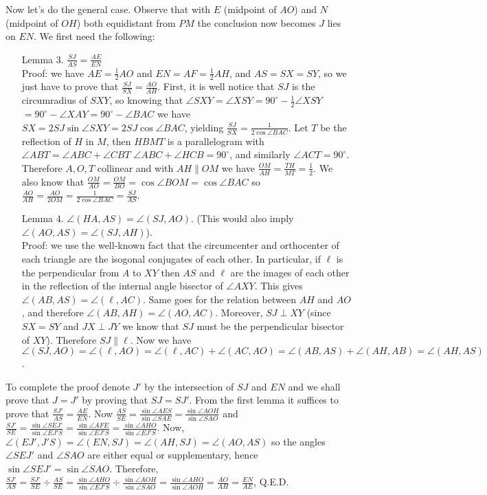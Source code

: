 \documentclass[11pt,a4paper]{article}
\begin{document}
\begin{itemize}
Now let's do the general case. Observe that with $E$ (midpoint of $AO$) and $N$ (midpoint of $OH$) both equidistant from $PM$ the conclusion now becomes $J$ lies on $EN$. We first need the following: 
\begin{itemize}
\item [Lemma 3.] $\frac {SJ}{AS}=\frac {AE}{EN}$\\
Proof: we have $AE=\frac 12 AO$ and $EN=AF=\frac 12 AH$, and $AS=SX=SY$, 
so we just have to prove that 
$\frac {SJ}{SX}=\frac {AO}{AH}$.
First, it is well notice that $SJ$ is the circumradius of $SXY$, so knowing that $\angle SXY=\angle XSY=90^{\circ}-\frac 12\angle XSY$
$= 90^{\circ}-\angle XAY=90^{\circ}-\angle BAC$ we have 
$SX=2SJ\sin\angle SXY=2SJ\cos\angle BAC$, yielding $\frac {SJ}{SX}=\frac {1}{2\cos\angle BAC}$.
Let $T$ be the reflection of $H$ in $M$, then $HBMT$ is a parallelogram with $\angle ABT=\angle ABC+\angle CBT$
$\angle ABC+\angle HCB=90^{\circ}$, and similarly $\angle ACT=90^{\circ}$. 
Therefore $A, O, T$ collinear and with $AH\parallel OM$ we have $\frac{OM}{AH}=\frac {TH}{MT}=\frac 12$. 
We also know that $\frac {OM}{AO}=\frac {OM}{BO}=\cos\angle BOM=\cos\angle BAC$
so $\frac {AO}{AH}=\frac {AO}{2OM}=\frac 1{2\cos\angle BAC}=\frac {SJ}{AS}$.
\item [Lemma 4.] $\angle (HA, AS)=\angle (SJ, AO)$. (This would also imply $\angle (AO, AS)=\angle (SJ, AH)$).\\
Proof: we use the well-known fact that the circumcenter and orthocenter of each triangle are the isogonal conjugates of each other. 
In particular, if $\ell$ is the perpendicular from $A$ to $XY$ then $AS$ and $\ell$ are the images of each other in the reflection of the internal angle bisector of $\angle AXY$. 
This gives $\angle (AB, AS)=\angle (\ell, AC)$. 
Same goes for the relation between $AH$ and $AO$, and therefore $\angle (AB, AH)=\angle (AO, AC)$. 
Moreover, $SJ\perp XY$ (since $SX=SY$ and $JX\perp JY$ we know that $SJ$ must be the perpendicular bisector of $XY$). 
Therefore $SJ\parallel \ell$. 
Now we have $\angle (SJ, AO)=\angle (\ell, AO)=\angle (\ell, AC)+\angle (AC, AO)=\angle (AB, AS)+\angle (AH, AB)=\angle (AH, AS)$. 
\end{itemize}

To complete the proof denote $J'$ by the intersection of $SJ$ and $EN$ and we shall prove that $J=J'$ by proving that $SJ=SJ'$. 
From the first lemma it suffices to prove that  $\frac {SJ'}{AS}=\frac {AE}{EN}$. 
Now $\frac {AS}{SE}=\frac{\sin\angle AES}{\sin\angle SAE}=\frac{\sin\angle AOH}{\sin\angle SAO}$ and 
$\frac{SJ'}{SE}=\frac{\sin\angle SEJ'}{\sin\angle EJ'S}=\frac{\sin\angle AFE}{\sin\angle EJ'S}=\frac{\sin\angle AHO}{\sin\angle EJ'S}$. 
Now, $\angle (EJ', J'S)=\angle (EN, SJ)=\angle (AH, SJ)=\angle (AO, AS)$ so the angles $\angle SEJ'$ and $\angle SAO$ are either equal or supplementary, hence $\sin\angle SEJ'=\sin\angle SAO$. 
Therefore, $\frac {SJ'}{AS}=\frac {SJ'}{SE}\div \frac {AS}{SE}= \frac{\sin\angle AHO}{\sin\angle EJ'S}\div\frac{\sin\angle AOH}{\sin\angle SAO}=\frac{\sin\angle AHO}{\sin\angle AOH}=\frac{AO}{AH}=\frac {EN}{AE}$, Q.E.D.


\end{itemize}
\end{document}
